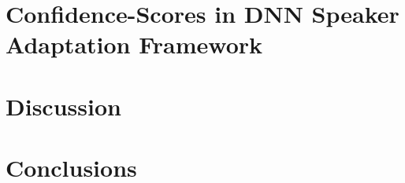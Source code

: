 \documentclass[a4paper]{article}
\begin{document}
\section{Confidence-Scores in DNN Speaker Adaptation Framework}\label{sec:Adaptation}


\section{Discussion}\label{sec:Discussion}


\section{Conclusions}\label{sec:conclusion}


%


\end{document}
